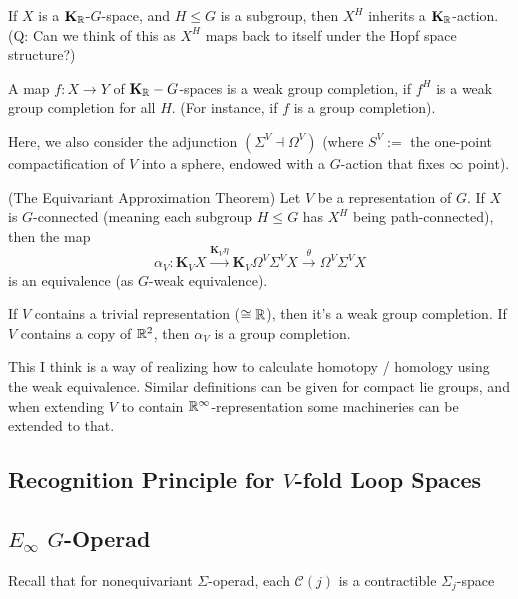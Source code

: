 \documentclass{article}
\begin{document}
If $X$ is a $\mathbf{K}_{\mathbb{R}}$-$G$-space, and $H\leq G$ is a subgroup, then $X^H$ inherits a $\mathbf{K}_{\mathbb{R}}$-action. (Q: Can we think of this as $X^H$ maps back to itself under the Hopf space structure?)

\begin{defn}
    A map $f:X\rightarrow Y$ of $\mathbf{K}_{\mathbb{R}}-G$-spaces is a weak group completion, if $f^H$ is a weak group completion for all $H$. (For instance, if $f$ is a group completion).
\end{defn}

\hfil

Here, we also consider the adjunction $(\Sigma^V\dashv \Omega^V)$ (where $S^V:=$ the one-point compactification of $V$ into a sphere, endowed with a $G$-action that fixes $\infty$ point).

\begin{thm}{(The Equivariant Approximation Theorem)}
    Let $V$ be a representation of $G$. If $X$ is $G$-connected (meaning each subgroup $H\leq G$ has $X^H$ being path-connected), then the map
    \[\alpha_V:\mathbf{K}_V X \xrightarrow{\mathbf{K}_V \eta}\mathbf{K}_V \Omega^V\Sigma^V X \xrightarrow{\theta}\Omega^V\Sigma^V X \]
    is an equivalence (as $G$-weak equivalence).

    If $V$ contains a trivial representation ($\cong\mathbb{R}$), then it's a weak group completion. If $V$ contains a copy of $\mathbb{R}^2$, then $\alpha_V$ is a group completion.
\end{thm}

This I think is a way of realizing how to calculate homotopy / homology using the weak equivalence. Similar definitions can be given for compact lie groups, and when extending $V$ to contain $\mathbb{R}^\infty$-representation some machineries can be extended to that.

\hfil

\hfil

\subsection{Recognition Principle for $V$-fold Loop Spaces}

\hfil

\hfil

\subsection{$E_\infty$ $G$-Operad}

Recall that for nonequivariant $\Sigma$-operad, each $\mathcal{C}(j)$ is a contractible $\Sigma_j$-space 
\end{document}
